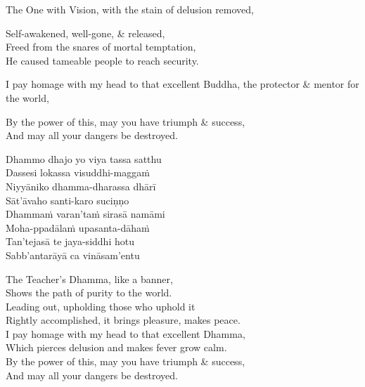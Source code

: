 \begin{english-verses}
  \begin{english-hang-first-line}
  The One with Vision, with the stain of delusion removed,\\
  \end{english-hang-first-line}
  Self-awakened, well-gone, \& released,\\
  Freed from the snares of mortal temptation,\\
  He caused tameable people to reach security.\\
  \begin{english-hang-together-verses}
    I pay homage with my head to that excellent Buddha, the protector \& mentor for the world,\\
  \end{english-hang-together-verses}
  By the power of this, may you have triumph \& success,\\
  And may all your dangers be destroyed.
\end{english-verses}

\ifninebythirteen\clearpage\fi

\begin{pali-hang-continued}
  Dhammo dhajo yo viya tassa satthu\\
  Dassesi lokassa visuddhi-maggaṁ\\
  Niyyāniko dhamma-dharassa dhārī\\
  Sāt'āvaho santi-karo suciṇṇo\\
  Dhammaṁ varan'taṁ sirasā namāmi\\
  Moha-ppadālaṁ upasanta-dāhaṁ\\
  Tan'tejasā te jaya-siddhi hotu\\
  Sabb'antarāyā ca vināsam'entu
\end{pali-hang-continued}

\ifafive\clearpage\fi

\begin{english-verses}
  The Teacher's Dhamma, like a banner,\\
  Shows the path of purity to the world.\\
  Leading out, upholding those who uphold it\\
  Rightly accomplished, it brings pleasure, makes peace.\\
  I pay homage with my head to that excellent Dhamma,\\
  Which pierces delusion and makes fever grow calm.\\
  By the power of this, may you have triumph \& success,\\
  And may all your dangers be destroyed.
\end{english-verses}

